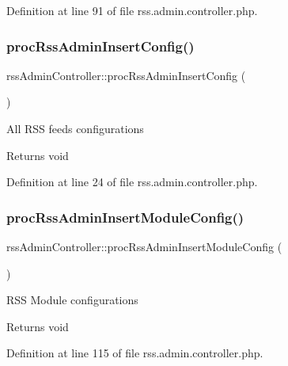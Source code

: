 Definition at line 91 of file rss.\+admin.\+controller.\+php.

\hypertarget{classrssAdminController_abacdc1717d07ac5cfe2d4bb83f08d310}{}\label{classrssAdminController_abacdc1717d07ac5cfe2d4bb83f08d310} 
\subsubsection{\texorpdfstring{proc\+Rss\+Admin\+Insert\+Config()}{procRssAdminInsertConfig()}}
{\footnotesize\ttfamily rss\+Admin\+Controller\+::proc\+Rss\+Admin\+Insert\+Config (\begin{DoxyParamCaption}{ }\end{DoxyParamCaption})}

All R\+SS feeds configurations

\begin{DoxyReturn}{Returns}
void 
\end{DoxyReturn}


Definition at line 24 of file rss.\+admin.\+controller.\+php.

\hypertarget{classrssAdminController_ae07c8748cdccb2d13dfb4140e9c13aeb}{}\label{classrssAdminController_ae07c8748cdccb2d13dfb4140e9c13aeb} 
\subsubsection{\texorpdfstring{proc\+Rss\+Admin\+Insert\+Module\+Config()}{procRssAdminInsertModuleConfig()}}
{\footnotesize\ttfamily rss\+Admin\+Controller\+::proc\+Rss\+Admin\+Insert\+Module\+Config (\begin{DoxyParamCaption}{ }\end{DoxyParamCaption})}

R\+SS Module configurations

\begin{DoxyReturn}{Returns}
void 
\end{DoxyReturn}


Definition at line 115 of file rss.\+admin.\+controller.\+php.

